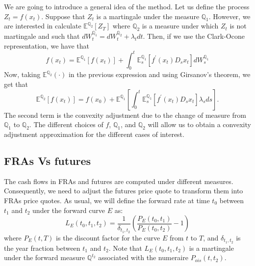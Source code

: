 \documentclass[a4paper,10pt]{article}
\newcommand{\1}{\mathbf{1}}
\begin{document}
We are going to introduce a general idea of the method. Let us define the process $Z_t = f(x_t)$. Suppose that $Z_t$ is a martingale under the measure $\mathbb{Q}_1$. However, we are interested in calculate $\mathbb{E}^{\mathbb{Q}_2}\left[Z_T \right]$ where $\mathbb{Q}_2$ is a measure under which $Z_t$ is not martingale and such that $dW^{\mathbb{Q}_1}_t = dW^{\mathbb{Q}_2}_t +\lambda_t dt$. Then, if we use the Clark-Ocone representation, we have that
\begin{equation*}
f(x_t) = \mathbb{E}^{\mathbb{Q}_1}\left[f(x_t)\right] + \int_{0}^{t} \mathbb{E}^{\mathbb{Q}_1}_s\left[ f^{\prime}(x_t) D_s x_t  \right] dW^{\mathbb{Q}_1}_s
\end{equation*}
Now, taking $\mathbb{E}^{\mathbb{Q}_2}\left( \cdot \right)$ in the previous expression and using Girsanov's theorem, we get that
\begin{equation}\label{general_convexity}
\mathbb{E}^{\mathbb{Q}_2}\left[ f(x_t) \right] = f(x_0) + \mathbb{E}^{\mathbb{Q}_1} \left[\int_{0}^{t}  \mathbb{E}^{\mathbb{Q}_1}_s\left[ f^{\prime}(x_t) D_s x_t  \right] \lambda_s ds \right]. 
\end{equation}
The second term is the convexity adjustment due to the change of measure from $\mathbb{Q}_1$ to $\mathbb{Q}_2$. The different choices of $f$, $\mathbb{Q}_1$, and $\mathbb{Q}_2$ will allow us to obtain a convexity adjustment approximation for the different cases of interest. 
\subsection{FRAs Vs futures}
 The cash flows in FRAs and futures are computed under different measures. Consequently, we need to adjust the futures price quote to transform them into FRAs price quotes. As usual, we will define the forward rate at time $t_0$ between $t_1$ and $t_2$ under the forward curve $E$ as:
\begin{equation}\label{forward_rate}
L_{E}(t_0, t_1, t_2) = \frac{1}{\delta_{t_1,t_2}}\left(\frac{P_{E}(t_0,t_1)}{P_{E}(t_0,t_2)} - 1 \right)
\end{equation} 
where $P_{E}(t,T)$ is the discount factor for the curve $E$ from $t$ to $T$, and $\delta_{t_1,t_2}$ is the year fraction between $t_1$ and $t_2$. Note that $L_{E}(t_0, t_1, t_2)$ is a martingale under the forward measure $\mathbb{Q}^{t_2}$ associated with the numeraire $P_{ois}(t,t_2)$.
\end{document}
